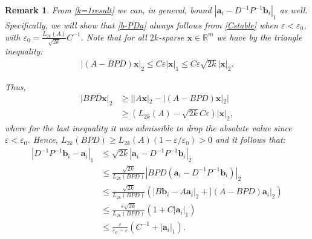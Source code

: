 \documentclass[journal, twocolumn]{IEEEtran}
\newtheorem{remark}{Remark}
\begin{document}
\begin{remark}\label{b-PDaProof}
From \eqref{k=1result} we can, in general, bound $|\mathbf{a}_i - D^{-1}P^{-1}\mathbf{b}_i|_1$ as well. Specifically, we will show that \eqref{b-PDa} always follows from \eqref{Cstable} when $\varepsilon < \varepsilon_0$, with $\varepsilon_0 = \frac{L_{2k}(A)}{\sqrt{2k}}C^{-1}$. Note that for all $2k$-sparse $\mathbf{x} \in \mathbb{R}^m$ we have by the triangle inequality:
\begin{align*}
|(A-BPD)\mathbf{x}|_2 
\leq C\varepsilon|\mathbf{x}|_1
\leq C \varepsilon \sqrt{2k}  |\mathbf{x}|_2.
\end{align*}

Thus,
\begin{align*}
|BPD\mathbf{x}|_2 
&\geq | |A\mathbf{x}|_2 - |(A-BPD)\mathbf{x}|_2 | \\
&\geq (L_{2k}(A) - \sqrt{2k}C\varepsilon ) |\mathbf{x}|_2,
\end{align*}
%
where for the last inequality it was admissible to drop the absolute value since $\varepsilon < \varepsilon_0$. Hence, $L_{2k}(BPD) \geq L_{2k}(A)\left( 1 - \varepsilon/\varepsilon_0 \right) > 0$ and it follows that:
\begin{align*}
|D^{-1}P^{-1}\mathbf{b}_i - \mathbf{a}_i|_1
&\leq \sqrt{2k} |\mathbf{a}_i - D^{-1}P^{-1}\mathbf{b}_i|_2 \\
&\leq \frac{\sqrt{2k}}{L_{2k}(BPD)}|BPD(\mathbf{a}_i - D^{-1}P^{-1}\mathbf{b}_i)|_2 \\
&\leq \frac{\sqrt{2k}}{L_{2k}(BPD)} (|B\mathbf{b}_i - A\mathbf{a}_i|_2 + |(A - BPD)\mathbf{a}_i|_2) \\
&\leq \frac{\varepsilon\sqrt{2k}}{L_{2k}(BPD)}(1+C|\mathbf{a}_i|_1) \\
&\leq \frac{\varepsilon }{\varepsilon_0 - \varepsilon} \left( C^{-1}+|\mathbf{a}_i|_1 \right).
\end{align*}
\end{remark}
\end{document}
